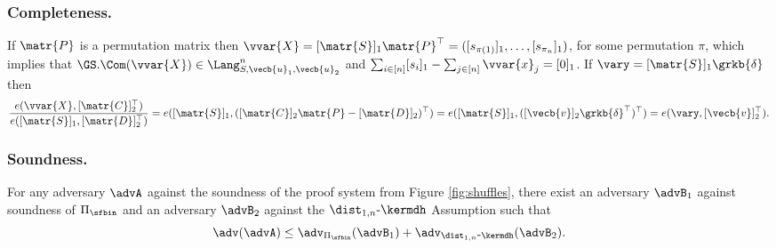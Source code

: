 \subsubsection{Completeness.} If $\matr{P}$ is a permutation matrix then $\vvar{X}=[\matr{S}]_1\matr{P}^\top=([s_{\pi(1)}]_1,\ldots,[s_{\pi_{n}}]_1)$, for some permutation $\pi$, which implies that $\GS.\Com(\vvar{X})\in\Lang_{S,\vecb{u}_1,\vecb{u}_2}^n$ and $\sum_{i\in[n]}[s_i]_1-\sum_{j\in[n]}\vvar{x}_j=[0]_1$. If $\vary=[\matr{S}]_1\grkb{\delta}$ then
\begin{eqnarray*}
\dfrac
    {e(\vvar{X},[\matr{C}]_2^\top)}
    {e([\matr{S}]_1,[\matr{D}]_2^\top)}
 = 
    e([\matr{S}]_1,([\matr{C}]_2\matr{P}-[\matr{D}]_2)^\top)
 = 
    e([\matr{S}]_1,([\vecb{v}]_2\grkb{\delta}^\top)^\top)
 =
    e(\vary,[\vecb{v}]_2^\top).
\end{eqnarray*}

\subsubsection{Soundness.}
\begin{theorem}
For any adversary $\advA$ against the soundness of the proof system from Figure \ref{fig:shuffles}, there exist an adversary $\advB_1$ against soundness of $\Pi_{\sfbin}$ and an adversary $\advB_2$ against the $\dist_{1,n}\mbox{-}\kermdh$ Assumption such that
$$\adv(\advA) \leq \adv_{\Pi_{\sfbin}}(\advB_1) + \adv_{\dist_{1,n}\mbox{-}\kermdh}(\advB_2).
$$
\end{theorem}

